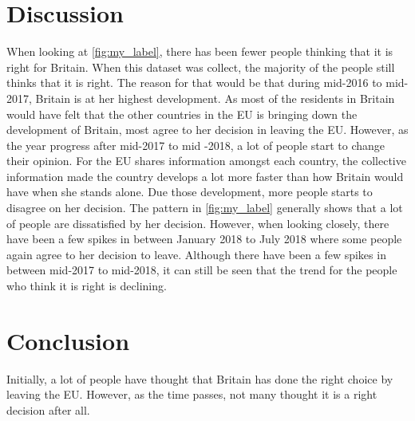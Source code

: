 \documentclass[a4paper,11pt]{article}
\begin{document}
\section{Discussion}
When looking at \autoref{fig:my_label}, there has been fewer people thinking that it is right for Britain. When this dataset was collect, the majority of the people still thinks that it is right. The reason for that would be that during mid-2016 to mid-2017, Britain is at her highest development. As most of the residents in Britain would have felt that the other countries in the EU is bringing down the development of Britain, most agree to her decision in leaving the EU. However, as the year progress after mid-2017 to mid -2018, a lot of people start to change their opinion. For the EU shares information amongst each country, the collective information made the country develops a lot more faster than how Britain would have when she stands alone. Due those development, more people starts to disagree on her decision. The pattern in \autoref{fig:my_label} generally shows that a lot of people are dissatisfied by her decision. However, when looking closely, there have been a few spikes in between January 2018 to July 2018 where some people again agree to her decision to leave. Although there have been a few spikes in between mid-2017 to mid-2018, it can still be seen that the trend for the people who think it is right is declining. 

\section{Conclusion}
Initially, a lot of people have thought that Britain has done the right choice by leaving the EU. However, as the time passes, not many thought it is a right decision after all.  
\end{document}
